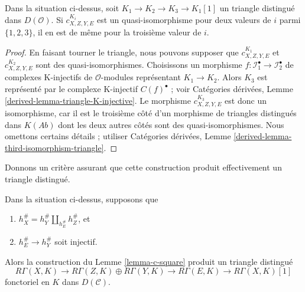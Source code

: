 \begin{lemma}
\label{lemma-two-out-of-three-blow-up-square}
Dans la situation ci-dessus, soit $K_1 \to K_2 \to K_3 \to K_1[1]$ un
triangle distingué dans $D(\mathcal{O})$. Si $c^{K_i}_{X, Z, Y, E}$ est un
quasi-isomorphisme pour deux valeurs de $i$ parmi $\{1, 2, 3\}$, il en est
de même pour la troisième valeur de $i$.
\end{lemma}

\begin{proof}
En faisant tourner le triangle, nous pouvons supposer que
$c^{K_1}_{X, Z, Y, E}$ et $c^{K_2}_{X, Z, Y, E}$ sont des
quasi-isomorphismes. Choisissons un morphisme
$f : \mathcal{I}^\bullet_1 \to \mathcal{I}^\bullet_2$ de complexes
K-injectifs de $\mathcal{O}$-modules représentant $K_1 \to K_2$. Alors
$K_3$ est représenté par le complexe K-injectif $C(f)^\bullet$ ; voir
Catégories dérivées, Lemme \ref{derived-lemma-triangle-K-injective}. Le
morphisme $c^{K_3}_{X, Z, Y, E}$ est donc un isomorphisme, car il est le
troisième côté d'un morphisme de triangles distingués dans
$K(\textit{Ab})$ dont les deux autres côtés sont des quasi-isomorphismes.
Nous omettons certains détails ; utiliser Catégories dérivées, Lemme
\ref{derived-lemma-third-isomorphism-triangle}.
\end{proof}

\noindent
Donnons un critère assurant que cette construction produit effectivement
un triangle distingué.

\begin{lemma}
\label{lemma-square-triangle}
Dans la situation ci-dessus, supposons que
\begin{enumerate}
\item $h_X^\# = h_Y^\# \amalg_{h_E^\#} h_Z^\#$, et
\item $h_E^\# \to h_Y^\#$ soit injectif.
\end{enumerate}
Alors la construction du Lemme \ref{lemma-c-square} produit un triangle
distingué
$$
R\Gamma(X, K) \to
R\Gamma(Z, K) \oplus
R\Gamma(Y, K) \to
R\Gamma(E, K) \to R\Gamma(X, K)[1]
$$
fonctoriel en $K$ dans $D(\mathcal{C})$.
\end{lemma}

